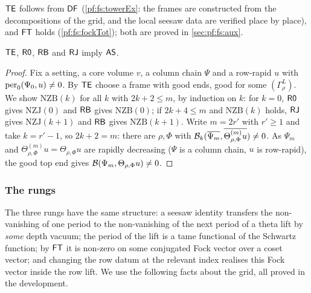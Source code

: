 $\mathsf{TE}$ follows from $\mathsf{DF}$ (\cref{pf:fs:towerEx}: the frames are constructed from the decompositions of the grid, and the local seesaw
data are verified place by place), and $\mathsf{FT}$ holds (\cref{pf:fs:fockTot}); both are proved in \cref{sec:pf:fs:aux}.

\begin{theorem}\label{pf:fs:ascentRungs}
$\mathsf{TE}$, $\mathsf{R0}$, $\mathsf{RB}$ and $\mathsf{RJ}$ imply $\mathsf{AS}$.
\end{theorem}

\begin{proof}
Fix a setting, a core volume $v$, a column chain $\Psi$ and a row-rapid $u$ with $\mathrm{per}_0(\Psi_0,u)\ne0$. By $\mathsf{TE}$ choose a frame
with good ends, good for some $(\Gamma^L_\rho)$. We show $\mathrm{NZB}(k)$ for all $k$ with $2k+2\le m$, by induction on $k$: for $k=0$,
$\mathsf{R0}$ gives $\mathrm{NZJ}(0)$ and $\mathsf{RB}$ gives $\mathrm{NZB}(0)$; if $2k+4\le m$ and $\mathrm{NZB}(k)$ holds, $\mathsf{RJ}$ gives
$\mathrm{NZJ}(k+1)$ and $\mathsf{RB}$ gives $\mathrm{NZB}(k+1)$. Write $m=2r'$ with $r'\ge1$ and take $k=r'-1$, so $2k+2=m$: there are
$\rho,\Phi$ with $\mathcal B_k(\overline{\Psi_m},\overline{\Theta^{(m)}_{\rho,\Phi}u})\ne0$. As $\Psi_m$ and $\Theta^{(m)}_{\rho,\Phi}u=\Theta_{\rho,\Phi}u$
are rapidly decreasing ($\Psi$ is a column chain, $u$ is row-rapid), the good top end gives $\mathcal B(\Psi_m,\Theta_{\rho,\Phi}u)\ne0$.
\end{proof}

\subsubsection{The rungs}

The three rungs have the same structure: a seesaw identity transfers the non-vanishing of one period to the non-vanishing of the next
period of a theta lift by \emph{some} depth vacuum; the period of the lift is a tame functional of the Schwartz function; by $\mathsf{FT}$ it
is non-zero on some conjugated Fock vector over a coset vector; and changing the row datum at the relevant index realises this Fock
vector inside the row lift. We use the following facts about the grid, all proved in the development.

